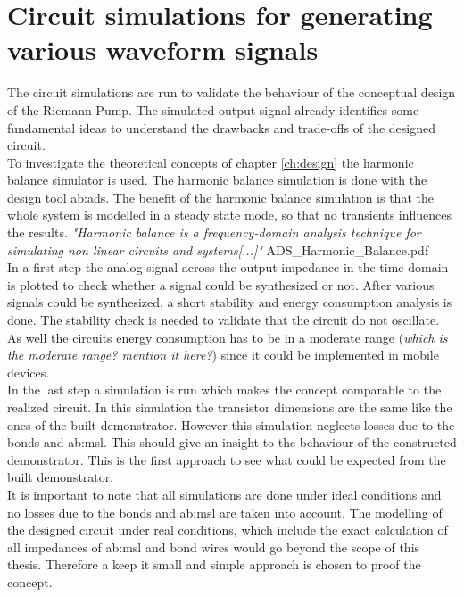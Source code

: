 \chapter{Circuit simulations for generating various waveform signals}
The circuit simulations are run to validate the behaviour of the conceptual design of the Riemann Pump. The simulated output signal already identifies some fundamental ideas to understand the drawbacks and trade-offs of the designed circuit.\\
To investigate the theoretical concepts of chapter \ref{ch:design} the harmonic balance simulator is used.
The harmonic balance simulation is done with the design tool \gls{ab:ads}.
The benefit of the harmonic balance simulation is that the whole system is modelled in a steady state mode, so that no transients influences the results. \textit{"Harmonic balance is a frequency-domain analysis technique for simulating non linear circuits and systems[...]"}  ADS\_Harmonic\_Balance.pdf\\
In a first step the analog signal across the output impedance in the time domain is plotted to check whether a signal could be synthesized or not. 
After various signals could be synthesized, a short stability and energy consumption analysis is done.
The stability check is needed to validate that the circuit do not oscillate.
As well the circuits energy consumption has to be in a moderate range (\textit{which is the moderate range? mention it here?}) since it could be implemented in mobile devices.\\
    In the last step a simulation is run which makes the concept comparable to the realized circuit. 
   In this simulation the transistor dimensions are the same like the ones of the built demonstrator. However this simulation neglects losses due to the bonds and \gls{ab:msl}. This should give an insight to the behaviour of the constructed demonstrator.
   This is the first approach to see what could be expected from the built demonstrator.\\
   It is important to note that all simulations are done under ideal conditions and no losses due to the bonds and \gls{ab:msl} are taken into account. 
    The modelling of the designed circuit under real conditions, which include the exact calculation of all impedances of \gls{ab:msl} and bond wires would go beyond the scope of this thesis. Therefore a keep it small and simple approach is chosen to proof the concept.\\   

